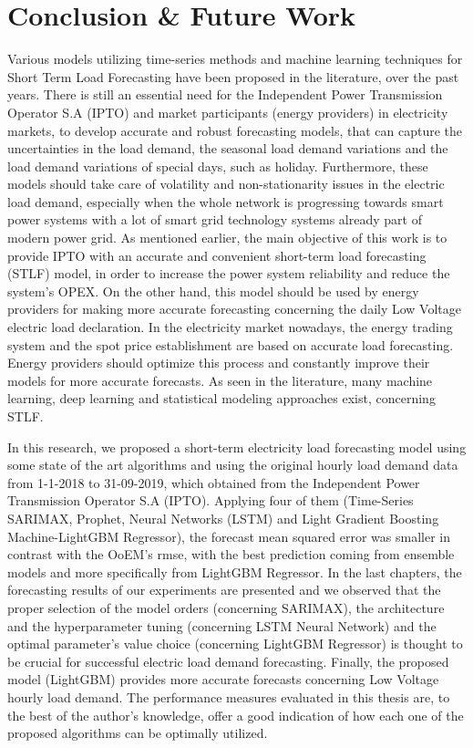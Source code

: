 \chapter{Conclusion \& Future Work}
Various models utilizing time-series methods and machine learning techniques for Short Term Load Forecasting have been proposed in the literature, over the past years. There is still an essential need for
the Independent Power Transmission Operator S.A (IPTO) and market participants (energy providers) in electricity markets, to develop accurate and robust forecasting models, that can capture the uncertainties
in the load demand, the seasonal load demand variations and the load demand variations of special days, such as holiday. Furthermore, these models should take care of volatility and non-stationarity issues in the electric load demand,  especially when the whole network is progressing towards smart power systems with a lot of smart grid technology systems already part of modern power grid. As mentioned earlier, the main objective of this work is to provide IPTO with an accurate and convenient short-term load forecasting (STLF) model, in order to increase the power system reliability and reduce the system's OPEX. On the other hand, this model should be used by energy providers for making more accurate forecasting concerning the daily Low Voltage electric load declaration. In the electricity market nowadays, the energy trading system and the spot price establishment are based on accurate load forecasting. Energy providers should optimize this process and constantly improve their models for more accurate forecasts. As seen in the literature, many machine learning, deep learning and statistical modeling approaches exist, concerning STLF.
\par In this research, we proposed a short-term electricity load forecasting model using some state of the art algorithms and using the original hourly load demand data from 1-1-2018 to 31-09-2019, which obtained from the Independent Power Transmission Operator S.A (IPTO). Applying four of them (Time-Series SARIMAX, Prophet, Neural Networks (LSTM) and Light Gradient Boosting Machine-LightGBM Regressor), the forecast mean squared error was smaller in contrast with the OoEM’s rmse, with the best prediction coming from ensemble models and more specifically from LightGBM Regressor. In the last chapters, the forecasting results of our experiments are presented and we observed that the proper selection of the model orders (concerning SARIMAX), the architecture and the hyperparameter tuning (concerning LSTM Neural Network) and the optimal parameter's value choice (concerning LightGBM Regressor) is thought to be crucial for successful electric load demand forecasting. Finally, the proposed model (LightGBM) provides more accurate forecasts concerning Low Voltage hourly load demand. The performance measures evaluated in this thesis are, to the best of the author’s knowledge, offer a good indication of how each one of the proposed algorithms can be optimally utilized.
